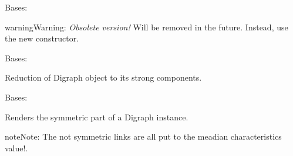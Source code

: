 \documentclass[letterpaper,10pt,english]{sphinxmanual}
\begin{document}

\begin{fulllineitems}
\label{techDoc:digraphs.RandomTree}
Bases: {\hyperref[techDoc:digraphs.Digraph]{\emph{}}}

\begin{notice}{warning}{Warning:}
\emph{Obsolete version!} Will be removed in the future. Instead, use
the new {\hyperref[techDoc:graphs.RandomTree]{\emph{}}} constructor.
\end{notice}

\begin{fulllineitems}
\label{techDoc:digraphs.RandomTree.prufer_to_tree}
\end{fulllineitems}


\end{fulllineitems}


\begin{fulllineitems}
\label{techDoc:digraphs.StrongComponentsCollapsedDigraph}
Bases: {\hyperref[techDoc:digraphs.Digraph]{\emph{}}}

Reduction of Digraph object to its strong components.

\begin{fulllineitems}
\label{techDoc:digraphs.StrongComponentsCollapsedDigraph.showComponents}
\end{fulllineitems}


\end{fulllineitems}


\begin{fulllineitems}
\label{techDoc:digraphs.SymmetricPartialDigraph}
Bases: {\hyperref[techDoc:digraphs.Digraph]{\emph{}}}

Renders the symmetric part of a Digraph instance.

\begin{notice}{note}{Note:}
The not symmetric links are all put to the meadian characteristics value!.
\end{notice}

\end{fulllineitems}
\end{document}
